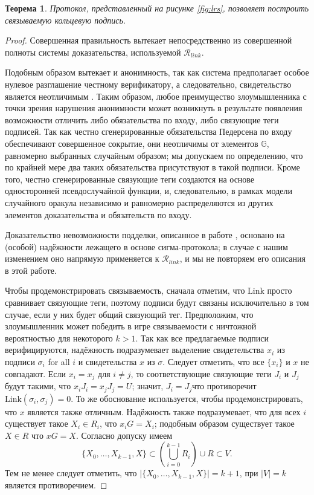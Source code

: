 \documentclass{article}
\newtheorem{theorem}{Теорема}
\theoremstyle{definition}
\begin{document}
\begin{theorem}
Протокол, представленный на рисунке \ref{fig:lrs}, позволяет построить связываемую кольцевую подпись.
\end{theorem}

\begin{proof}
Совершенная правильность вытекает непосредственно из совершенной полноты системы доказательства, используемой $\mathcal{R}_{link}$.

Подобным образом вытекает и анонимность, так как система предполагает особое нулевое разглашение честному верификатору, а следовательно, свидетельство является неотличимым \cite{cramer}.
Таким образом, любое преимущество злоумышленника с точки зрения нарушения анонимности может возникнуть в результате появления возможности отличить либо обязательства по входу, либо связующие теги подписей.
Так как честно сгенерированные обязательства Педерсена по входу обеспечивают совершенное сокрытие, они неотличимы от элементов \begin{math}\mathbb{G}\end{math}, равномерно выбранных случайным образом; мы допускаем по определению, что по крайней мере два таких обязательства присутствуют в такой подписи.
Кроме того, честно сгенерированные связующие теги создаются на основе односторонней псевдослучайной функции, и, следовательно, в рамках модели случайного оракула независимо и равномерно распределяются из других элементов доказательства и обязательств по входу.

Доказательство невозможности подделки, описанное в работе \cite{groth}, основано на (особой) надёжности лежащего в основе сигма-протокола; в случае с нашим изменением оно напрямую применяется к $\mathcal{R}_{link}$, и мы не повторяем его описания в этой работе.

Чтобы продемонстрировать связываемость, сначала отметим, что $\text{Link}$ просто сравнивает связующие теги, поэтому подписи будут связаны исключительно в том случае, если у них будет общий связующий тег.
Предположим, что злоумышленник может победить в игре связываемости с ничтожной вероятностью для некоторого $k > 1$.
Так как все предлагаемые подписи верифицируются, надёжность подразумевает выделение свидетельства $x_i$ из подписи $\sigma_i$ for all $i$ и свидетельства $x$ из $\sigma$.
Следует отметить, что все $\{x_i\}$ и $x$ не совпадают.
Если $x_i = x_j$ для $i \neq j$, то соответствующие связующие теги $J_i$ и $J_j$ будут такими, что $x_iJ_i = x_jJ_j = U$; значит, $J_i = J_j$что противоречит $\text{Link}(\sigma_i,\sigma_j) = 0$.
То же обоснование используется, чтобы продемонстрировать, что $x$ является также отличным.
Надёжность также подразумевает, что для всех $i$ существует такое $X_i \in R_i$, что $x_iG = X_i$; подобным образом существует такое $X \in R$ что $xG = X$.
Согласно допуску имеем $$\{X_0,\ldots,X_{k-1},X\} \subset \left( \bigcup_{i=0}^{k-1} R_i \right) \cup R \subset V.$$
Тем не менее следует отметить, что $\left| \{X_0,\ldots,X_{k-1},X\} \right| = k+1$, при $\left| V \right| = k$ является противоречием.


\end{proof}
\end{document}
